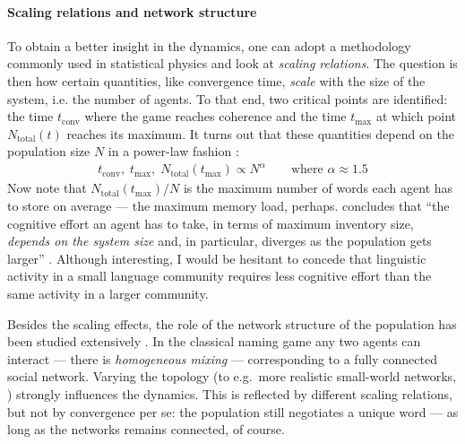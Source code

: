 \documentclass{../src/bcthesispart}
\begin{document}
\paragraph{Scaling relations and network structure}

To obtain a better insight in the dynamics, one can adopt a methodology commonly used in statistical physics and look at \emph{scaling relations}.
The question is then how certain quantities, like convergence time, \emph{scale} with the size of the system, i.e. the number of agents.
To that end, two critical points are identified: the time $t_{\text{conv}}$ where the game reaches coherence and the time $t_{\text{max}}$ at which point $N_{\text{total}}(t)$ reaches its maximum.
It turns out that these quantities depend on the population size $N$ in a power-law fashion \parencite{Baronchelli2006a,Loreto2011}:
\begin{align}
	\label{eq:ch3:scaling-naming-game}
	t_{\text{conv}}, 
		\; t_{\text{max}},
		\; N_{\text{total}}(t_{\text{max}}) \propto N^\alpha
	 \qquad \text{where $\alpha \approx 1.5$}	
\end{align}
Now note that $N_{\text{total}}(t_{\text{max}}) / N$ is the maximum number of words each agent has to store on average — the maximum memory load, perhaps.
\textcite{Baronchelli2017} concludes that “the cognitive effort an agent has to take, in terms of maximum inventory size, \emph{depends on the system size} and, in particular, diverges as the population gets larger” \parencite[][italics in original]{Baronchelli2017}.
Although interesting, I would be hesitant to concede that linguistic activity in a small language community requires less cognitive effort than the same activity in a larger community.




Besides the scaling effects, the role of the network structure of the population has been studied extensively \parencite[see][for an overview]{Baronchelli2017}.
In the classical naming game any two agents can interact — there is  \emph{homogeneous mixing} — corresponding to a fully connected social network.
Varying the topology (to e.g.~more realistic small-world networks, \cite{DallAsta2006}) strongly influences the dynamics.
This is reflected by different scaling relations, but not by convergence per se: the population still negotiates a unique word — as long as the networks remains connected, of course.




\end{document}
